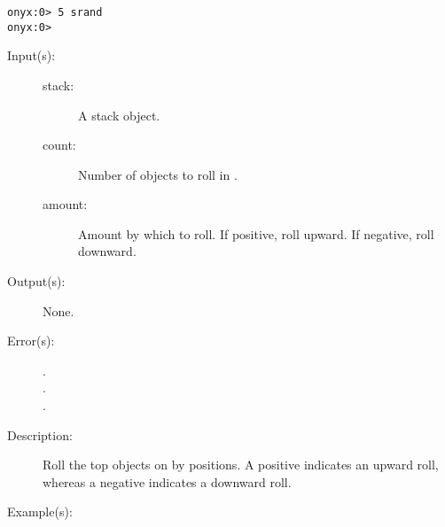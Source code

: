 \begin{description}
\begin{description}
\begin{verbatim}
onyx:0> 5 srand
onyx:0>
		\end{verbatim}
	\end{description}
\label{systemdict:sroll}
\item[{\onyxop{stack count amount}{sroll}{--}}: ]
	\begin{description}\item[]
	\item[Input(s): ]
		\begin{description}\item[]
		\item[stack: ]
			A stack object.
		\item[count: ]
			Number of objects to roll in .
		\item[amount: ]
			Amount by which to roll.  If positive, roll
			upward.  If negative, roll downward.
		\end{description}
	\item[Output(s): ] None.
	\item[Error(s): ]
		\begin{description}\item[]
		\item[.]
		\item[.]
		\item[.]
		\end{description}
	\item[Description: ]
		Roll the top  objects on  by
		 positions.  A positive 
		indicates an upward roll, whereas a negative 
		indicates a downward roll.
	\item[Example(s): ]\begin{verbatim}


\end{verbatim}
\end{description}
\end{description}
